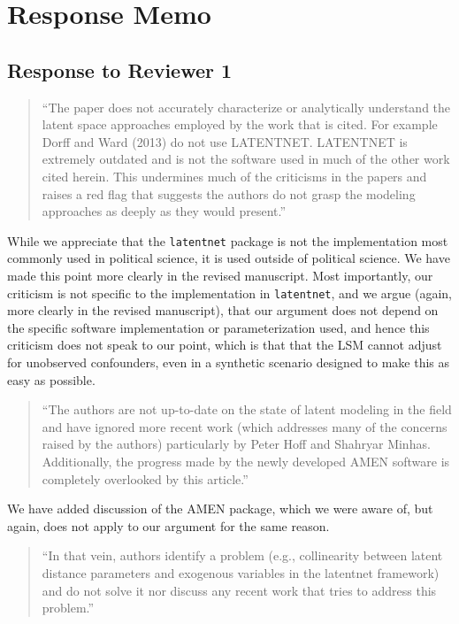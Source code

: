 \section{Response Memo}\label{response-memo}

\subsection{Response to Reviewer 1}\label{response-to-reviewer-1}

\begin{quote}
``The paper does not accurately characterize or analytically understand
the latent space approaches employed by the work that is cited. For
example Dorff and Ward (2013) do not use LATENTNET. LATENTNET is
extremely outdated and is not the software used in much of the other
work cited herein. This undermines much of the criticisms in the papers
and raises a red flag that suggests the authors do not grasp the
modeling approaches as deeply as they would present.''
\end{quote}

While we appreciate that the \texttt{latentnet} package is not the
implementation most commonly used in political science, it is used
outside of political science. We have made this point more clearly in
the revised manuscript. Most importantly, our criticism is not specific
to the implementation in \texttt{latentnet}, and we argue (again, more
clearly in the revised manuscript), that our argument does not depend on
the specific software implementation or parameterization used, and hence
this criticism does not speak to our point, which is that that the LSM
cannot adjust for unobserved confounders, even in a synthetic scenario
designed to make this as easy as possible.

\begin{quote}
``The authors are not up-to-date on the state of latent modeling in the
field and have ignored more recent work (which addresses many of the
concerns raised by the authors) particularly by Peter Hoff and Shahryar
Minhas. Additionally, the progress made by the newly developed AMEN
software is completely overlooked by this article.''
\end{quote}

We have added discussion of the AMEN package, which we were aware of,
but again, does not apply to our argument for the same reason.

\begin{quote}
``In that vein, authors identify a problem (e.g., collinearity between
latent distance parameters and exogenous variables in the latentnet
framework) and do not solve it nor discuss any recent work that tries to
address this problem.''
\end{quote}

